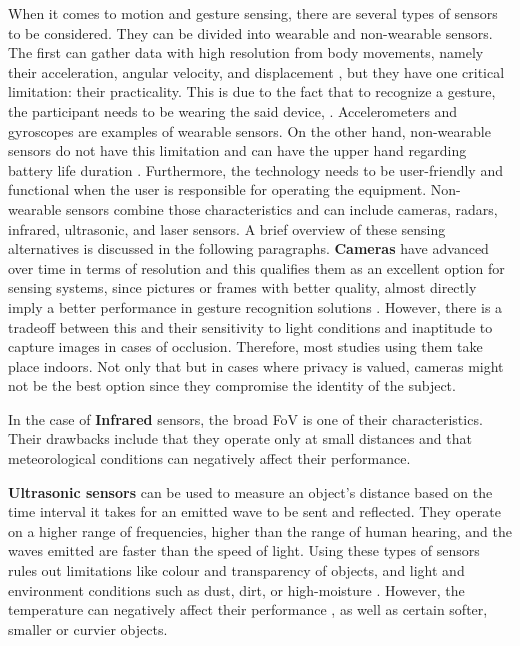 When it comes to motion and gesture sensing, there are several types of sensors to be considered. They can be divided into wearable and non-wearable sensors. The first can gather data with high resolution from body movements, namely their acceleration, angular velocity, and displacement \cite{SOA_FMCW_biLSTM},  but they have one critical limitation: their practicality. This is due to the fact that to recognize a gesture, the participant needs to be wearing the said device, \cite{FMCWtempofeature}. Accelerometers and gyroscopes are examples of wearable sensors.
On the other hand, non-wearable sensors do not have this limitation and can have the upper hand regarding battery life duration \cite{SOA_FMCW_biLSTM}. Furthermore, the technology needs to be user-friendly and functional when the user is responsible for operating the equipment. Non-wearable sensors combine those characteristics and can include cameras, radars, infrared, ultrasonic, and laser sensors. A brief overview of these sensing alternatives is discussed in the following paragraphs.
\textbf{Cameras} have advanced over time in terms of resolution and this qualifies them as an excellent option for sensing systems, since pictures or frames with better quality, almost directly imply a better performance in gesture recognition solutions \cite{IETBiometricsCameras}. However, there is a tradeoff between this and their sensitivity to light conditions and inaptitude to capture images in cases of occlusion. Therefore, most studies using them take place indoors. Not only that but in cases where privacy is valued, cameras might not be the best option since they compromise the identity of the subject.

In the case of \textbf{Infrared} sensors, the broad \gls{FoV} is one of their characteristics. Their drawbacks include that they operate only at small distances and that meteorological conditions can negatively affect their performance.

\textbf{Ultrasonic sensors} can be used to measure an object's distance based on the time interval it takes for an emitted wave to be sent and reflected. They operate on a higher range of frequencies, higher than the range of human hearing, and the waves emitted are faster than the speed of light. Using these types of sensors rules out limitations like colour and transparency of objects, and light and environment conditions such as  dust, dirt, or high-moisture \cite{ultrasonic}. However, the temperature can negatively affect their performance \cite{ultrasonicRadar}, as well as certain softer, smaller or curvier objects.

